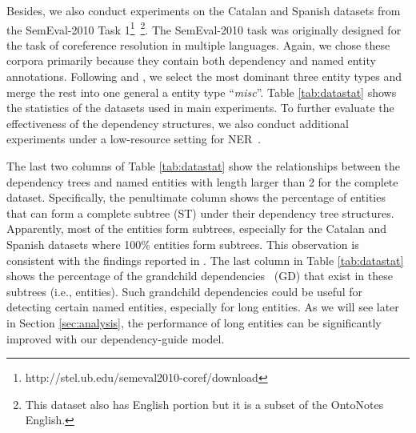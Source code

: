Besides, we also conduct experiments on the Catalan and Spanish datasets from the SemEval-2010 Task 1\footnote{http://stel.ub.edu/semeval2010-coref/download}~\cite{recasens2010semeval}\footnote{This dataset also has English portion but it is a subset of the OntoNotes English.}. 
The SemEval-2010 task was originally designed for the task of coreference resolution in multiple languages. 
Again, we chose these corpora primarily because they contain both dependency and named entity annotations.
Following \citet{finkel2009joint} and \citet{jie2017efficient}, we select the most dominant three entity types and merge the rest into one general a entity type ``\textit{misc}''. 
Table \ref{tab:datastat} shows the statistics of the datasets used in main experiments. 
To further evaluate the effectiveness of the dependency structures, we also conduct additional experiments under a low-resource setting for NER~\cite{cotterell2017low}. 

The last two columns of Table \ref{tab:datastat} show the relationships between the dependency trees and named entities with length larger than 2 for the complete dataset. 
Specifically, the penultimate column shows the percentage of entities that can form a complete subtree (ST) under their dependency tree structures. 
Apparently, most of the entities form subtrees, especially for the Catalan and Spanish datasets where 100\% entities form subtrees.  
This observation is consistent with the findings reported in \citet{jie2017efficient}. 
The last column in Table \ref{tab:datastat} shows the percentage of the grandchild dependencies~\cite{koo2010efficient} (GD) that exist in these subtrees (i.e., entities).  
Such grandchild dependencies could be useful for detecting certain named entities, especially for long entities.
As we will see later in Section \ref{sec:analysis}, the performance of long entities can be significantly improved with our dependency-guide model. 





